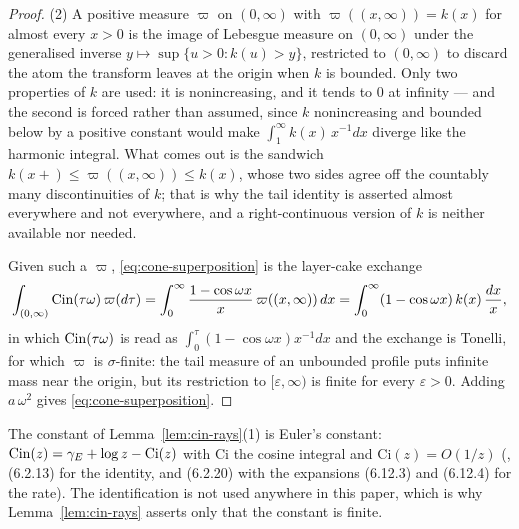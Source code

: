 \begin{proof}
(2) A positive measure $\varpi$ on $(0,\infty)$ with $\varpi((x,\infty)) = k(x)$ for almost
every $x > 0$ is the image of Lebesgue measure on $(0,\infty)$ under the generalised inverse
$y \mapsto \sup\{u > 0 : k(u) > y\}$, restricted to $(0,\infty)$ to discard the atom the
transform leaves at the origin when $k$ is bounded. Only two properties of $k$ are used: it is
nonincreasing, and it tends to $0$ at infinity --- and the second is forced rather than
assumed, since $k$ nonincreasing and bounded below by a positive constant would make
$\int_1^\infty k(x)\,x^{-1}dx$ diverge like the harmonic integral. What comes out is the
sandwich $k(x{+}) \le \varpi((x,\infty)) \le k(x)$, whose two sides agree off the countably
many discontinuities of $k$; that is why the tail identity is asserted almost everywhere and
not everywhere, and a right-continuous version of $k$ is neither available nor needed.

Given such a $\varpi$, \ref{eq:cone-superposition} is the layer-cake exchange
\[
  \int_{(0,\infty)} \operatorname{Cin}(\tau\omega)\,\varpi(d\tau)
  = \int_0^\infty \frac{1 - \cos\omega x}{x}\,\varpi((x,\infty))\,dx
  = \int_0^\infty (1 - \cos\omega x)\,k(x)\,\frac{dx}{x},
\]
in which $\operatorname{Cin}(\tau\omega)$ is read as $\int_0^\tau (1-\cos\omega x)x^{-1}dx$ and the exchange
is Tonelli, for which $\varpi$ is $\sigma$-finite: the tail measure of an unbounded profile
puts infinite mass near the origin, but its restriction to $[\varepsilon,\infty)$ is finite
for every $\varepsilon > 0$. Adding $a\,\omega^2$ gives
\ref{eq:cone-superposition}.
\end{proof}

\begin{remark}\label{rem:cin-constant}
The constant of Lemma~\ref{lem:cin-rays}(1) is Euler's constant: $\operatorname{Cin}(z) = \gamma_E + \log z -
\mathrm{Ci}(z)$ with $\mathrm{Ci}$ the cosine integral and $\mathrm{Ci}(z) = O(1/z)$
(, (6.2.13) for the identity, and (6.2.20) with the expansions (6.12.3) and
(6.12.4) for the rate). The identification is not used anywhere in this paper, which is
why Lemma~\ref{lem:cin-rays} asserts only that the constant is finite.
\end{remark}

